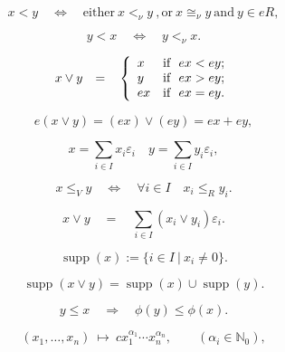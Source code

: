\documentclass{article}
\begin{document}
\begin{equation}\label{eq:I.6.10}
x<y{\quad {\Leftrightarrow} \quad } \text{either}\ x <_\nu y\ , \text{or}\ x\cong_\nu y\ \text{and}\ y\in eR,\end{equation}

\begin{equation}\label{eq:I.6.11}
y<x {\quad {\Leftrightarrow} \quad }   y<_\nu x.\end{equation}

\begin{equation}\label{eq:I.6.13}
x \vee y{\quad {=} \quad } \left\{
                  \begin{array}{ll}
                    x & \hbox{if \ } ex < ey; \\
                    y & \hbox{if \ } ex > ey;\\
                    ex & \hbox{if \ } ex =  ey.
                  \end{array}
                \right.
\end{equation}

\begin{equation}\label{eq:I.6.13}
e(x \vee y) = (ex)\vee (ey) = ex + ey,
\end{equation}

$$x=\sum_{i\in I}x_i{\varepsilon}_i\quad y=\sum_{i\in I}y_i{\varepsilon}_i,$$

\begin{equation}\label{eq:I.6.14}
x\le_Vy {\quad {\Leftrightarrow} \quad } \forall i\in I\quad x_i\le_Ry_i.\end{equation}

\begin{equation}\label{eq:I.6.15}
x\vee y {\quad {=} \quad }  \sum _{i \in I} (x_i \vee y_i){\varepsilon}_i.\end{equation}

\begin{equation}\label{eq:I.6.16}
{\operatorname{supp}}(x) := \{  i \in I {\ {|} \ } x_i \neq 0\}.    \end{equation}

\begin{equation}\label{eq:I.6.17}
{\operatorname{supp}}(x \vee y) ={\operatorname{supp}}(x) \cup {\operatorname{supp}}(y).    \end{equation}

$$y\le x {\quad {\Rightarrow} \quad } {\phi}  (y)\le{\phi}  (x).$$

$$(x_1,\dots, x_n) {\ {\mapsto} \ } cx_1^{{\alpha} _1}\cdots x_n^{{\alpha} _n}, \qquad ({\alpha} _i\in{\mathbb N}_0),$$
\end{document}
